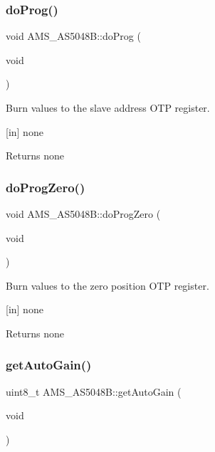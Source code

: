 \subsubsection{\texorpdfstring{do\+Prog()}{doProg()}}
{\footnotesize\ttfamily void A\+M\+S\+\_\+\+A\+S5048\+B\+::do\+Prog (\begin{DoxyParamCaption}\item[{void}]{ }\end{DoxyParamCaption})}



Burn values to the slave address O\+TP register. 

\mbox{[}in\mbox{]} none \begin{DoxyReturn}{Returns}
none 
\end{DoxyReturn}
\mbox{\label{classAMS__AS5048B_a69012e91b30cd4182f072a7d2f377305}} 
\subsubsection{\texorpdfstring{do\+Prog\+Zero()}{doProgZero()}}
{\footnotesize\ttfamily void A\+M\+S\+\_\+\+A\+S5048\+B\+::do\+Prog\+Zero (\begin{DoxyParamCaption}\item[{void}]{ }\end{DoxyParamCaption})}



Burn values to the zero position O\+TP register. 

\mbox{[}in\mbox{]} none \begin{DoxyReturn}{Returns}
none 
\end{DoxyReturn}
\mbox{\label{classAMS__AS5048B_a5be27698e144b1889f9df2f43ad85cc9}} 
\subsubsection{\texorpdfstring{get\+Auto\+Gain()}{getAutoGain()}}
{\footnotesize\ttfamily uint8\+\_\+t A\+M\+S\+\_\+\+A\+S5048\+B\+::get\+Auto\+Gain (\begin{DoxyParamCaption}\item[{void}]{ }\end{DoxyParamCaption})}



